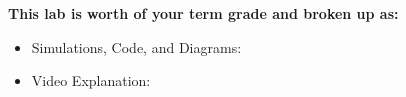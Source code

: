 \vspace{0.5cm}

\textbf{
This lab is worth \labTwoIsWorth{} of your term grade and broken up as:
}
\begin{itemize}
    \item Simulations, Code, and Diagrams: \labTwoSimsWorth
    \item Video Explanation: \labTwoVideoWorth
\end{itemize}
